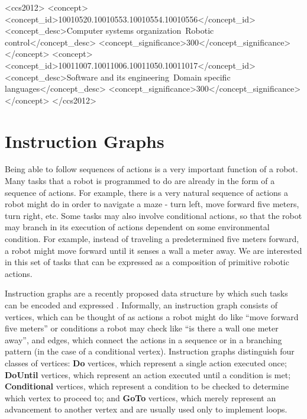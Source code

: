 \documentclass{sig-alternate-05-2015}
\begin{document}
%
%
 \begin{CCSXML}
<ccs2012>
<concept>
<concept_id>10010520.10010553.10010554.10010556</concept_id>
<concept_desc>Computer systems organization~Robotic control</concept_desc>
<concept_significance>300</concept_significance>
</concept>
<concept>
<concept_id>10011007.10011006.10011050.10011017</concept_id>
<concept_desc>Software and its engineering~Domain specific languages</concept_desc>
<concept_significance>300</concept_significance>
</concept>
</ccs2012>
\end{CCSXML}


%
%

%
%
\printccsdesc



\section{Instruction Graphs}
Being able to follow sequences of actions is a very important function of a
robot. Many tasks that a robot is programmed to do are already in the form of
a sequence of actions. For example, there is a very natural sequence of actions
a robot might do in order to navigate a maze - turn left, move forward five
meters, turn right, etc. Some tasks may also involve conditional actions, so
that the robot may branch in its execution of actions dependent on some
environmental condition. For example, instead of traveling a predetermined five
meters forward, a robot might move forward until it senses a wall a meter away.
We are interested in this set of tasks that can be expressed as a composition of
primitive robotic actions.

Instruction graphs are a recently proposed data structure by which such tasks
can be encoded and expressed \cite{veloso:instructiongraphs}. Informally, an
instruction graph consists of vertices, which can be thought of as actions a
robot might do like ``move forward five meters'' or conditions a robot may check
like ``is there a wall one meter away'', and edges, which connect the actions in
a sequence or in a branching pattern (in the case of a conditional vertex).
Instruction graphs distinguish four classes of vertices: \textbf{Do} vertices,
which represent a single action executed once; \textbf{DoUntil} vertices,
which represent an action executed until a condition is met;
\textbf{Conditional} vertices, which represent a condition to be checked to
determine which vertex to proceed to; and \textbf{GoTo} vertices, which
merely represent an advancement to another vertex and are usually used only to
implement loops.
\end{document}
